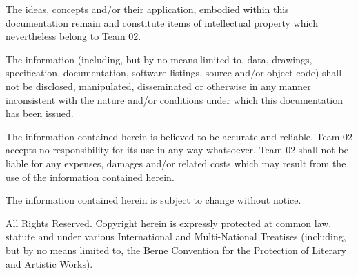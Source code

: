 The ideas, concepts and/or their application, embodied within this documentation remain and constitute items of intellectual property which nevertheless belong to Team 02.

The information (including, but by no means limited to, data, drawings, specification, documentation, software listings, source and/or object code) shall not be disclosed, manipulated, disseminated or otherwise in any manner inconsistent with the nature and/or conditions under which this documentation has been issued.

The information contained herein is believed to be accurate and reliable. Team 02 accepts no responsibility for its use in any way whatsoever. Team 02 shall not be liable for any expenses, damages and/or related costs which may result from the use of the information contained herein.

The information contained herein is subject to change without notice.

All Rights Reserved. Copyright herein is expressly protected at common law, statute and under various International and Multi-National Treatises (including, but by no means limited to, the Berne Convention for the Protection of Literary and Artistic Works).

